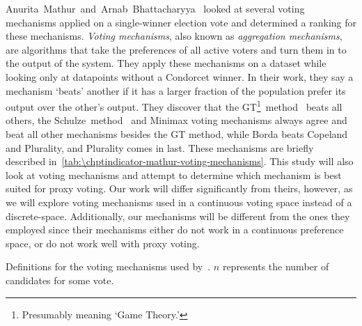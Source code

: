 Anurita~Mathur~and~Arnab~Bhattacharyya~\cite{Mathur2017} looked at several voting
mechanisms applied on a single-winner election vote and determined a ranking for
these mechanisms.
\textit{Voting mechanisms}, also known as \textit{aggregation mechanisms}, are
algorithms that take the preferences of all active voters and turn them in to the
output of the system.
They apply these mechanisms on a dataset while looking only at datapoints without a
Condorcet winner.
In their work, they say a mechanism `beats' another if it has a larger fraction of
the population prefer its output over the other's output.
They discover that the GT\footnote{
    Presumably meaning `Game Theory.'
}~method~\cite{Rivest2010} beats all others, the Schulze~method~\cite{Schulze2011}
and Minimax voting mechanisms always agree and beat all other mechanisms besides the
GT method, while Borda beats Copeland and Plurality, and Plurality comes in last.
These mechanisms are briefly described in~\autoref{tab:\chptindicator-mathur-voting-mechanisms}.
This study will also look at voting mechanisms and attempt to determine which
mechanism is best suited for proxy voting.
Our work will differ significantly from theirs, however, as we will explore voting
mechanisms used in a continuous voting space instead of a discrete-space.
Additionally, our mechanisms will be different from the ones they employed since
their mechanisms either do not work in a continuous preference space, or do not work
well with proxy voting.

\begin{table}[htbp]
    \renewcommand{\arraystretch}{1.3}

    \caption{
        Definitions for the voting mechanisms used by~\cite{Mathur2017}.
        $n$ represents the number of candidates for some vote.
    }
    \label{tab:\chptindicator-mathur-voting-mechanisms}

    \centering
    
\end{table}


